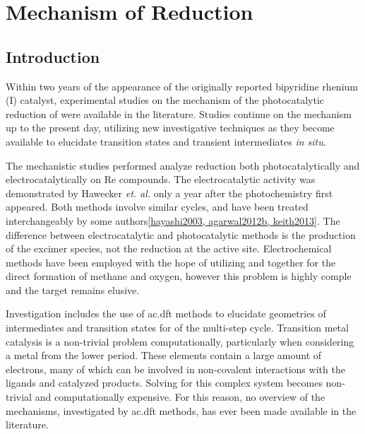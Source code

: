 \chapter{Mechanism of \texorpdfstring{}{CO2} Reduction}\label{chap.mech}

\section{Introduction}

Within two years of the appearance of the originally reported bipyridine rhenium (I) catalyst, experimental studies on the mechanism of the photocatalytic reduction of  were available in the literature\autocite{kutal1985, sullivan1985}. Studies continue on the mechanism up to the present day\autocite{johnson1996, koike2002, gibson2003, hayashi2003, takeda2008, takeda2010, smieja2012, machan2014, kou2014}, utilizing new investigative techniques as they become available to elucidate transition states and transient intermediates \textit{in situ}. 

The mechanistic studies performed analyze  reduction both photocatalytically and electrocatalytically on Re compounds. The electrocatalytic activity was demonstrated by Hawecker \textit{et. al.} only a year after the photochemistry first appeared\autocite{hawecker1984}. Both methods involve similar cycles, and have been treated interchangeably by some authors\autoref{hayashi2003, agarwal2012b, keith2013}. The difference between electrocatalytic and photocatalytic methods is the production of the excimer species, not the reduction at the active site. Electrochemical methods have been employed with the hope of utilizing  and  together for the direct formation of methane and oxygen, however this problem is highly comple and the target remains elusive\autocite{roy2010, asatani2014}.

Investigation includes the use of \gls{ac.dft} methods to elucidate geometries of intermediates and transition states for of the multi-step cycle. Transition metal catalysis is a non-trivial problem computationally, particularly when considering a metal from the lower period. These elements contain a large amount of electrons, many of which can be involved in non-covalent interactions with the ligands and catalyzed products. Solving for this complex system becomes non-trivial and computationally expensive. For this reason, no overview of the mechanisms, investigated by \gls{ac.dft} methods, has ever been made available in the literature. 

